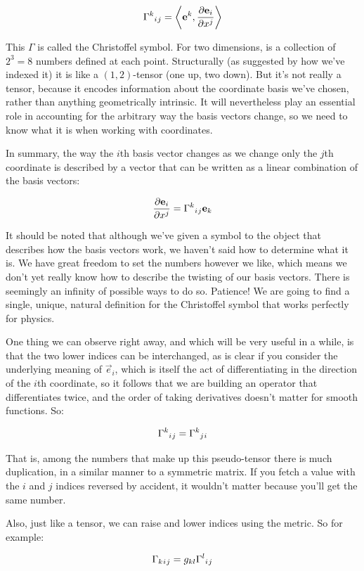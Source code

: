 $$
\Gamma\indices{^k_i_j} = \biggl< \vec{e}^k , \frac{\partial \vec{e}_i}{\partial x^j} \biggr>
$$

This $\Gamma$ is called the Christoffel symbol. For two dimensions, is a collection of $2^3 = 8$ numbers defined at each point. Structurally (as suggested by how we've indexed it) it is like a $(1, 2)$-tensor (one up, two down). But it's not really a tensor, because it encodes information about the coordinate basis we've chosen, rather than anything geometrically intrinsic. It will nevertheless play an essential role in accounting for the arbitrary way the basis vectors change, so we need to know what it is when working with coordinates.

In summary, the way the $i$th basis vector changes as we change only the $j$th coordinate is described by a vector that can be written as a linear combination of the basis vectors:

$$
\frac{\partial \vec{e}_i}{\partial x^j}
= \Gamma\indices{^k_i_j} \vec{e}_k
$$

It should be noted that although we've given a symbol to the object that describes how the basis vectors work, we haven't said how to determine what it is. We have great freedom to set the numbers however we like, which means we don't yet really know how to describe the twisting of our basis vectors. There is seemingly an infinity of possible ways to do so. Patience! We are going to find a single, unique, natural definition for the Christoffel symbol that works perfectly for physics.

One thing we can observe right away, and which will be very useful in a while, is that the two lower indices can be interchanged, as is clear if you consider the underlying meaning of $\vec{e}_i$, which is itself the act of differentiating in the direction of the $i$th coordinate, so it follows that we are building an operator that differentiates twice, and the order of taking derivatives doesn't matter for smooth functions. So:

$$
\Gamma\indices{^k_i_j} = \Gamma\indices{^k_j_i}
$$

That is, among the numbers that make up this pseudo-tensor there is much duplication, in a similar manner to a symmetric matrix. If you fetch a value with the $i$ and $j$ indices reversed by accident, it wouldn't matter because you'll get the same number.

Also, just like a tensor, we can raise and lower indices using the metric. So for example:

$$
\Gamma\indices{_k_i_j} 
= 
g_{kl}
\Gamma\indices{^l_i_j}
$$

